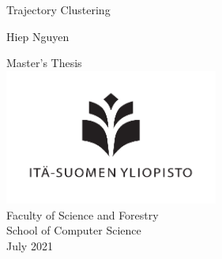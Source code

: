 \def \ajankohtaenglish {July 2021 }
\def \authorname {Hiep Nguyen }
\def \thesistitle {Trajectory Clustering }
\def \campus {Joensuu }
\def \facultyschooleng {School of Computer Science }
\def \supervisorseng {Pasi Fr{\"a}nti and Radu Mariescu-Istodor}

\def \documenttypeeng {Master's Thesis }

\def \mypagecount {70 }


\vspace*{3cm}
\vspace{0.5cm}

\begin{center}
\begin{LARGE}\thesistitle \end{LARGE}

\vspace{1.5cm}

\begin{Large}\authorname \end{Large}


{\large
\documenttypeeng
~\\
\includegraphics[width=7cm]{UEF_fin_pysty_1_black}\\
Faculty of Science and Forestry\\
\facultyschooleng \\
\ajankohtaenglish \\
}
\end{center}

\vspace{0.5cm}

